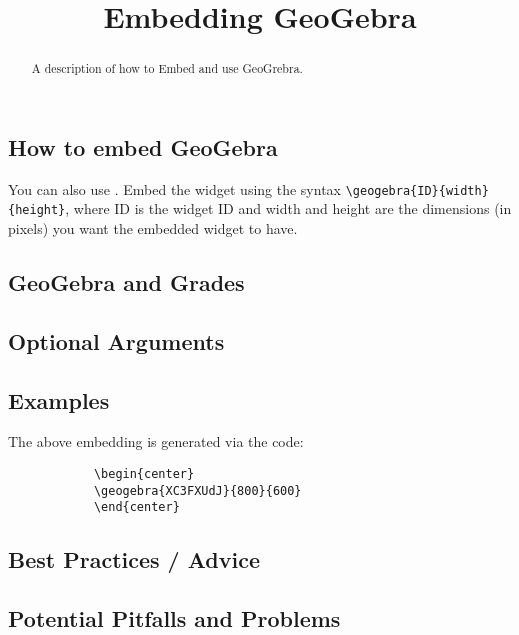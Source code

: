 \documentclass{ximera}
\title{Embedding GeoGebra}
\begin{document}
\begin{abstract}
    A description of how to Embed and use GeoGrebra.
\end{abstract}
\maketitle


    \subsection*{How to embed GeoGebra}

        You can also use . Embed the
        widget using the syntax \verb|\geogebra{ID}{width}{height}|, where ID
        is the widget ID and width and height are the dimensions (in pixels)
        you want the embedded widget to have.
        
        
    \subsection*{GeoGebra and Grades}
        
        

    \subsection*{Optional Arguments}
    
        

    \subsection*{Examples}
    
        \begin{center}
        \end{center}
        
        The above embedding is generated via the code:
        
        \begin{verbatim}
            \begin{center}
            \geogebra{XC3FXUdJ}{800}{600}
            \end{center}
        \end{verbatim}      
    
    \subsection*{Best Practices / Advice}
    
        
    
    \subsection*{Potential Pitfalls and Problems}    
    
        
        
\end{document}
